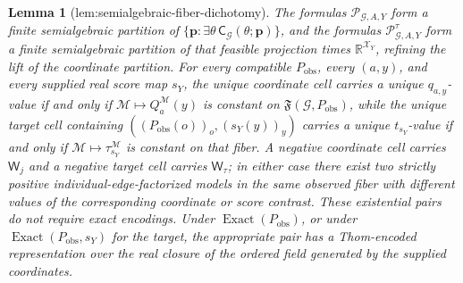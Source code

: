 \documentclass{article}
\newtheorem{lemma}{Lemma}
\begin{document}
\begin{lemma}[lem:semialgebraic-fiber-dichotomy]\label{lem:semialgebraic-fiber-dichotomy}
The formulas \(\mathscr P_{\mathcal G,A,Y}\) form a finite semialgebraic partition of \(\{\mathbf p:\exists\theta\,\mathsf C_{\mathcal G}(\theta;\mathbf p)\}\), and the formulas \(\mathscr P^{\tau}_{\mathcal G,A,Y}\) form a finite semialgebraic partition of that feasible projection times \(\mathbb R^{\mathcal X_Y}\), refining the lift of the coordinate partition. For every compatible \(P_{\mathrm{obs}}\), every \((a,y)\), and every supplied real score map \(s_Y\), the unique coordinate cell carries a unique \(q_{a,y}\)-value if and only if \(\mathcal M\mapsto Q_a^{\mathcal M}(y)\) is constant on \(\mathfrak F(\mathcal G,P_{\mathrm{obs}})\), while the unique target cell containing \(((P_{\mathrm{obs}}(o))_o,(s_Y(y))_y)\) carries a unique \(t_{s_Y}\)-value if and only if \(\mathcal M\mapsto\tau_{s_Y}^{\mathcal M}\) is constant on that fiber. A negative coordinate cell carries \(\mathsf W_j\) and a negative target cell carries \(\mathsf W_{\tau}\); in either case there exist two strictly positive individual-edge-factorized models in the same observed fiber with different values of the corresponding coordinate or score contrast. These existential pairs do not require exact encodings. Under \(\operatorname{Exact}(P_{\mathrm{obs}})\), or under \(\operatorname{Exact}(P_{\mathrm{obs}},s_Y)\) for the target, the appropriate pair has a Thom-encoded representation over the real closure of the ordered field generated by the supplied coordinates.
\end{lemma}
\end{document}

